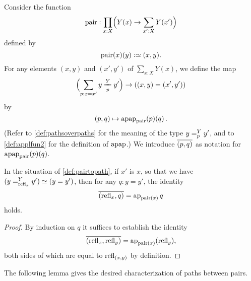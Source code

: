 \begin{definition}
{}
  Consider the function
  \[
    \pair : \prod_{x:X} \Bigl( Y(x) \to \sum _{x':X} Y(x') \Bigr)
  \]
  defined by
  \[
    \pair(x)(y) \defeq (x,y).
  \]
  For any elements $(x,y)$ and $(x',y')$ of $\sum _{x:X} Y(x)$, we define the map
  \[
    \Bigl( \sum_{p:x=x'} \pathover y Y p {y'} \Bigr)
    \to \left ( (x,y) = (x',y') \right )
  \]
  by
  \[
    (p,q) \mapsto \apap {\pair} p q.
  \]
  (Refer to \cref{def:pathsoverpaths} for the meaning of the type $\pathover y Y p {y'}$, and to \cref{def:applfun2} for the definition of $\mathrm{apap}$.)
  We introduce $\overline{({p},{q})}$ as notation for $\apap {\pair} p q$.
\end{definition}

\begin{lemma}\label{cor:isEq-pair=}
  In the situation of \cref{def:pairtopath}, if $x'$ is $x$,
  so that we have $( \pathover y Y {\refl x} {y'} ) \jdeq ( y = y' )$,
  then for any $q : y = y'$, the identity
  \[
    \pathpair {\refl x} q = \ap {\pair (x)} q
  \]
  holds.
\end{lemma}

\begin{proof}
  By induction on $q$ it suffices to establish the identity
  \[
    \pathpair {\refl x} {\refl y} = \ap {\pair (x)} (\refl y),
  \]
  both sides of which are
  equal to $\mathrm{refl}_{(x,y)}$ by definition.
\end{proof}

The following lemma gives the desired characterization of paths between pairs.

